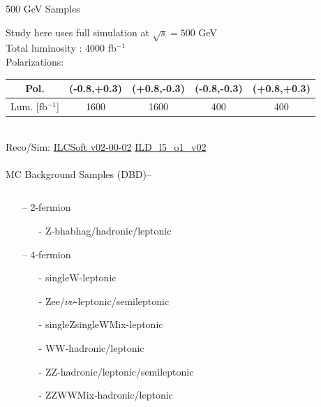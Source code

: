 \documentclass[10pt]{beamer}
\begin{document}
\begin{frame}{500 GeV Samples}

Study here uses full simulation at $\sqrt{s} = 500$ GeV\\
Total luminosity : 4000 fb$^{-1}$\\
Polarizations:
\scriptsize
\begin{tabular}{|c|c|c|c|c|}
\hline 
Pol. &(-0.8,+0.3) & (+0.8,-0.3) & (-0.8,-0.3) & (+0.8,+0.3) \\ 
\hline 
Lum. [fb$^{-1}$] & 1600 & 1600 & 400 & 400 \\ 
\hline 
\end{tabular} 
\normalsize
\quad \quad \\
Reco/Sim: \quad \scriptsize
\url{ILCSoft v02-00-02} \quad
\url{ILD_l5_o1_v02}\\
\quad \quad \\
\normalsize
MC Background Samples (DBD)--\\

\begin{columns}
\begin{column}{0.5\textwidth}

\begin{itemize}

	\item[--] 2-fermion 
		\begin{itemize}
			\scriptsize
			\item[-] Z-bhabhag/hadronic/leptonic
		\end{itemize}
	\item[--] 4-fermion 
		\begin{itemize}
			\scriptsize
			\item[-] singleW-leptonic 
			\item[-]Zee/$\nu\nu$-leptonic/semileptonic 
			\item[-]singleZsingleWMix-leptonic 
			\item[-]WW-hadronic/leptonic
			\item[-]ZZ-hadronic/leptonic/semileptonic
			\item[-]ZZWWMix-hadronic/leptonic
		\end{itemize}
	

\end{itemize}


\end{column}
\end{columns}
\end{frame}
\end{document}
